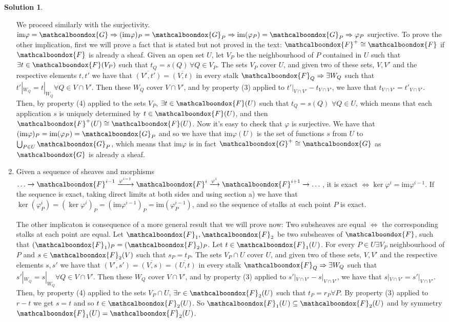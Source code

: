 \documentclass[12pt]{article}
\newcommand{\imp}{\ensuremath{\Rightarrow}}
\newcommand{\ima}{\ensuremath{\mathrm{im}}}
\theoremstyle{definition}
\newtheorem*{sol}{Solution}
\newcommand{\sF}{\ensuremath{\mathcalboondox{F}}}
\newcommand{\sG}{\ensuremath{\mathcalboondox{G}}}
\begin{document}
\begin{sol}
\begin{enumerate}[label=\alph*)]
		We proceed similarly with the surjectivity. $\ima \varphi = \sG \imp (\ima \varphi)_P = \sG_P \imp \ima (\varphi_P) = \sG_P \imp \varphi_P$ surjective. To prove the other implication, first we will prove a fact that is stated but not proved in the text: $\sF^{+} \cong \sF$ if $\sF$ is already a sheaf. Given an open set $U$, let $V_P$ be the neighbourhood of $P$ contained in $U$ such that $\exists t \in \sF(V_P)$ such that $t_Q = s(Q) \, \forall Q \in V_P$. The sets $V_P$ cover $U$, and given two of these sets, $V,V'$ and the respective elements $t,t'$ we have that $\overline{(V',t')} = \overline{(V,t)}$ in every stalk $\sF_Q \imp \exists W_Q$ such that $t'|_{W_Q} = t|_{W_Q} \forall Q \in V \cap V'$. Then these $W_Q$ cover $V \cap V'$, and by property (3) applied to $t'|_{V\cap V'}-t_{V\cap V'}$, we have that $t_{V\cap V'} = t'_{V \cap V'}$. Then, by property (4) applied to the sets $V_P$, $\exists t \in \sF(U)$ such that $t_Q = s(Q) \, \, \forall Q \in U$, which means that each application $s$ is uniquely determined by $t \in \sF(U)$, and then $\sF^{+}(U) \cong \sF(U)$. Now it's easy to check that $\varphi$ is surjective. We have that $(\ima \varphi)_P = \ima (\varphi_P) = \sG_P$ and so we have that $\ima \varphi (U)$ is the set of functions $s$ from $U$ to $\bigcup_{P \in U} \sG_P$, which means that $\ima \varphi$ is in fact $\sG^{+} \cong \sG$ as $\sG$ is already a sheaf.

		\item Given a sequence of sheaves and morphisms $\dots \xrightarrow[]{} \sF^{i-1} \xrightarrow[]{\varphi^{i-1}} \sF^{i} \xrightarrow[]{\varphi^{i}} \sF^{i+1} \xrightarrow[]{} \dots$, it is exact $\iff \ker \varphi^{i} = \ima \varphi^{i-1}$. If the sequence is exact, taking direct limits at both sides and using section a) we have that $\ker (\varphi^{i}_P) = (\ker \varphi^{i})_P = (\ima \varphi^{i-1})_P = \ima (\varphi^{i-1}_P) $, and so the sequence of stalks at each point $P$ is exact.

		The other implicaton is consequence of a more general result that we will prove now: Two subsheaves are equal $\iff$ the corresponding stalks at each point are equal. Let $\sF_1, \sF_2$ be two subsheaves of $\sF$, such that $(\sF_1)_P = (\sF_2)_P$. Let $t \in \sF_1(U)$. For every $P \in U \exists V_P$ neighbourhood of $P$ and $s \in \sF_2(V)$ such that $s_P = t_P$. The sets $V_P \cap U$ cover $U$, and given two of these sets, $V,V'$ and the respective elements $s,s'$ we have that $\overline{(V',s')} = \overline{(V,s)} = \overline{(U,t)}$ in every stalk $\sF_Q \imp \exists W_Q$ such that $s'|_{W_Q} = s|_{W_Q} \forall Q \in V \cap V'$. Then these $W_Q$ cover $V \cap V'$, and by property (3) applied to $s'|_{V\cap V'}-s|_{V\cap V'}$, we have that $s|_{V\cap V'} = s'|_{V \cap V'}$. Then, by property (4) applied to the sets $V_P \cap U$, $\exists r \in \sF_2(U)$ such that $t_P = r_P \forall P$. By property (3) applied to $r-t$ we get $s = t$ and so $t \in \sF_2(U)$. So $\sF_1(U) \subseteq \sF_2(U)$ and by symmetry $\sF_1(U) = \sF_2(U)$.
	\end{enumerate}
\end{sol}
\end{document}
